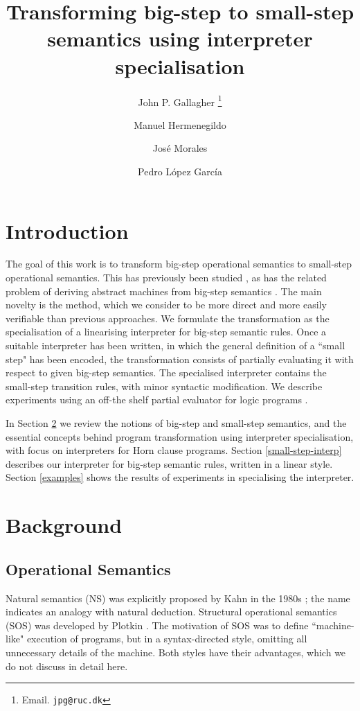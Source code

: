 \documentclass{llncs}
\title{Transforming big-step to small-step semantics using interpreter specialisation}
\author{John P. Gallagher \thanks{Email. \texttt{jpg@ruc.dk}}\inst{1}\inst{2}
\and
Manuel Hermenegildo\inst{2}  \and Jos\'e Morales
\inst{2} \and Pedro L\'opez Garc\'ia\inst{2} 
}
\institute{Roskilde University, Denmark
\and
IMDEA Software Institute, Madrid, Spain}
\begin{document}
\maketitle


\pagestyle{plain}
\pagestyle{myheadings}

\section{Introduction}

The goal of this work is to transform big-step operational semantics to small-step operational semantics.
This has previously been studied \cite{Vesely-Fisher,Hulzing,Ambal}, as has the related problem of deriving abstract
machines from big-step semantics \cite{Ager}. The main novelty is the method, which we consider to be more
direct and more easily verifiable than previous approaches.  We formulate the transformation as the specialisation of a
linearising interpreter for big-step semantic rules.  Once a suitable interpreter has been written, in which the general
definition of a ``small step" has been encoded, the transformation
consists of partially evaluating it with respect to given big-step semantics.  The specialised interpreter contains the 
small-step transition rules, 
with minor syntactic modification. We describe experiments using an off-the shelf partial evaluator 
for logic programs \cite{Logen}.

In Section \ref{background} we review the notions of big-step and small-step semantics, and
the essential concepts behind program transformation using interpreter specialisation, with focus on interpreters for
Horn clause programs. Section \ref{small-step-interp} describes our interpreter for big-step semantic rules,
written in a linear style. Section \ref{examples} shows the results of experiments in specialising the interpreter.

\section{Background}\label{background}

\subsection{Operational Semantics}
Natural semantics (NS) was explicitly proposed by Kahn in the 
1980s \cite{Kahn87}; the name indicates an analogy with natural deduction. 
Structural operational semantics (SOS) was developed by Plotkin \cite{Plotkin1981,Plotkin04,Plotkin04a}.  
The motivation of SOS was to define
``machine-like" execution of programs, but in a syntax-directed style, omitting all unnecessary details of
the machine.  Both styles have their advantages, which we do not discuss in detail here.
\end{document}
